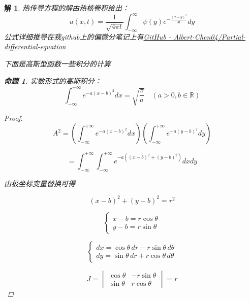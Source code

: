 \documentclass[12pt,a4paper]{article}
\newtheorem*{solution}{解}
\newtheorem{proposition}{命题}
\begin{document}
\begin{solution}

	热传导方程的解由热核卷积给出：
	\[
	u(x,t) = \frac{1}{\sqrt{4\pi t}} \int_{-\infty}^\infty \psi(y) e^{-\frac{(x-y)^2}{4t}} dy
	\]
	公式详细推导在我github上的偏微分笔记上有\href{https://github.com/Albert-Chen04/Partial-differential-equation}{GitHub - Albert-Chen04/Partial-differential-equation}
	
	下面是高斯型函数一些积分的计算
	
	
	
\begin{proposition}
	\label{ex:1}
	实数形式的高斯积分：
	\begin{equation}
		\int_{-\infty}^{+\infty} e^{-a(x-b)^2} dx = \sqrt{\frac{\pi}{a}} \quad (a>0, b \in \mathbb{R})
	\end{equation}
\end{proposition}
	
	\begin{proof}
		\begin{equation*}
		A^2 = \left( \int_{-\infty}^{+\infty} e^{-a(x-b)^2} dx \right) \left( \int_{-\infty}^{+\infty} e^{-a(y-b)^2} dy \right)
	\end{equation*}
	
	\begin{equation*}
		= \int_{-\infty}^{+\infty} \int_{-\infty}^{+\infty} e^{-a((x-b)^2 + (y-b)^2)} dx dy
	\end{equation*}
	
	由极坐标变量替换可得
	
	\begin{equation*}
		(x - b)^2 + (y - b)^2 = r^2
	\end{equation*}
	
	\begin{equation*}
		\begin{cases}
			x - b = r \cos\theta \\
			y - b = r \sin\theta
		\end{cases}
	\end{equation*}
	
	\begin{equation*}
		\begin{cases}
			dx = \cos\theta \, dr - r \sin\theta \, d\theta \\
			dy = \sin\theta \, dr + r \cos\theta \, d\theta
		\end{cases}
	\end{equation*}
	
	\begin{equation*}
		J = \begin{vmatrix}
			\cos\theta & -r \sin\theta \\
			\sin\theta & r \cos\theta
		\end{vmatrix} = r
	\end{equation*}
	

\end{proof}
\end{solution}
\end{document}
